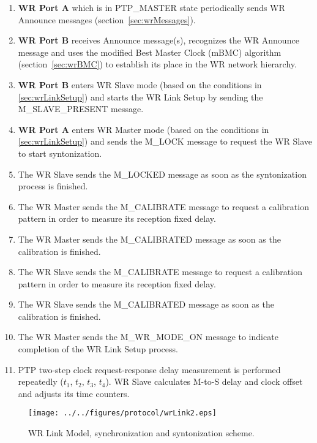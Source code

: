 \begin{enumerate}
\item \textbf{WR Port A} which is in PTP\_MASTER state periodically sends WR Announce messages
      (section~\ref{sec:wrMessages}).
\item \textbf{WR Port B} receives Announce message(s), recognizes the WR Announce message and 
      uses the modified Best Master Clock (mBMC) algorithm (section~\ref{sec:wrBMC}) to establish its
      place in the WR network hierarchy.
\item \textbf{WR Port B} enters WR Slave mode (based on the conditions in 
      \ref{sec:wrLinkSetup}) and starts the WR Link Setup by sending the M\_SLAVE\_PRESENT message.
\item \textbf{WR Port A} enters WR Master mode (based on the conditions in 
      \ref{sec:wrLinkSetup}) and sends the M\_LOCK message to request the WR Slave to start
      syntonization.
\item The WR Slave sends the M\_LOCKED message as soon as the syntonization process is 
      finished.
\item The WR Master sends the M\_CALIBRATE message to request a calibration pattern in order to 
      measure its reception fixed delay.
\item The WR Master sends the M\_CALIBRATED message as soon as the calibration is 
      finished.
\item The WR Slave sends the M\_CALIBRATE message to request a calibration pattern in order to 
      measure its reception fixed delay.
\item The WR Slave sends the M\_CALIBRATED message as soon as the calibration is 
      finished.
\item The WR Master sends the M\_WR\_MODE\_ON message to indicate completion of  the WR
      Link Setup process.
\item PTP two-step clock request-response delay measurement is performed repeatedly ($t_{1}$,
      $t_{2}$, $t_{3}$, $t_{4}$). WR Slave calculates M-to-S delay and clock offset and adjusts its
      time counters.
\end{enumerate}


\begin{figure}[!t]
\centering
\texttt{[image: ../../figures/protocol/wrLink2.eps]}
\caption{WR Link  Model, synchronization and syntonization scheme.}
\label{fig:wrLink}
\end{figure}




